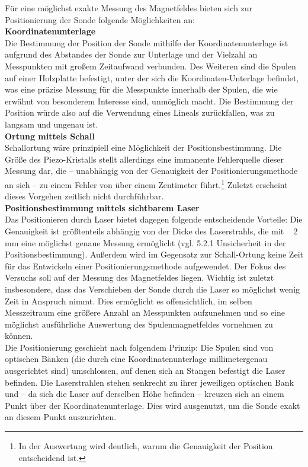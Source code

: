 \documentclass[12pt,a4paper]{article}
\begin{document}
Für eine möglichst exakte Messung des Magnetfeldes bieten sich zur Positionierung der Sonde folgende Möglichkeiten an:\\

\noindent \textbf{Koordinatenunterlage}\\
Die Bestimmung der Position der Sonde mithilfe der Koordinatenunterlage ist aufgrund des Abstandes der Sonde zur Unterlage und der Vielzahl an Messpunkten mit großem Zeitaufwand verbunden. Des Weiteren sind die Spulen auf einer Holzplatte befestigt, unter der sich die Koordinaten-Unterlage befindet, was eine präzise Messung für die Messpunkte innerhalb der Spulen, die wie erwähnt von besonderem Interesse sind, unmöglich macht. Die Bestimmung der Position würde also auf die Verwendung eines Lineals zurückfallen, was zu langsam und ungenau ist.\\
\textbf{Ortung mittels Schall}\\
Schallortung wäre prinzipiell eine Möglichkeit der Positionsbestimmung. Die Größe des Piezo-Kristalls stellt allerdings eine immanente Fehlerquelle dieser Messung dar, die – unabhängig von der Genauigkeit der Positionierungsmethode an sich – zu einem Fehler von über einem Zentimeter führt.\footnote{In der Auswertung wird deutlich, warum die Genauigkeit der Position entscheidend ist.} Zuletzt erscheint dieses Vorgehen zeitlich nicht durchführbar.\\
\textbf{Positionsbestimmung mittels sichtbarem Laser}\\
Das Positionieren durch Laser bietet dagegen folgende entscheidende Vorteile: Die Genauigkeit ist größtenteils abhängig von der Dicke des Laserstrahls, die mit ~ 2 mm eine möglichst genaue Messung ermöglicht (vgl. 5.2.1 Unsicherheit in der Positionsbestimmung). Außerdem wird im Gegensatz zur Schall-Ortung keine Zeit für das Entwickeln einer Positionierungsmethode aufgewendet. Der Fokus des Versuchs soll auf der Messung des Magnetfeldes liegen. Wichtig ist zuletzt insbesondere, dass das Verschieben der Sonde durch die Laser so möglichst wenig Zeit in Anspruch nimmt. Dies ermöglicht es offensichtlich, im selben Messzeitraum eine größere Anzahl an Messpunkten aufzunehmen und so eine möglichst ausführliche Auswertung des Spulenmagnetfeldes vornehmen zu können.\\

Die Positionierung geschieht nach folgendem Prinzip: Die Spulen sind von optischen Bänken (die durch eine Koordinatenunterlage millimetergenau ausgerichtet sind) umschlossen, auf denen sich an Stangen befestigt die Laser befinden. Die Laserstrahlen stehen senkrecht zu ihrer jeweiligen optischen Bank und – da sich die Laser auf derselben Höhe befinden – kreuzen sich an einem Punkt über der Koordinatenunterlage. Dies wird ausgenutzt, um die Sonde exakt an diesem Punkt auszurichten.\\
 
\end{document}
